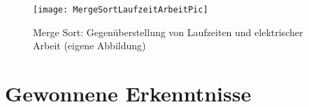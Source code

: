 
\begin{figure}[H]
	\begin{center}	 
	\texttt{[image: MergeSortLaufzeitArbeitPic]}
	\caption{Merge Sort: Gegenüberstellung von Laufzeiten und elektrischer Arbeit (eigene Abbildung)}
	\label{fig:MergeSortLaufzeitArbeitPic} 
	\end{center}
\end{figure}

\section{Gewonnene Erkenntnisse}